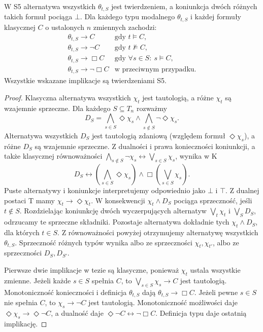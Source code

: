 \begin{lemat}
\label{lem:ncl-modal-S5-partition}
W S5 alternatywa wszystkich $\theta_{t,S}$
jest twierdzeniem, a koniunkcja dwóch różnych
takich formuł pociąga $\bot$.
Dla każdego typu modalnego $\theta_{t,S}$
i każdej formuły klasycznej $C$ o ustalonych
$n$ zmiennych zachodzi:
\[
\begin{array}{ll}
 \theta_{t,S}\to C &\text{gdy }t\models C,\\
 \theta_{t,S}\to\neg C &\text{gdy }t\not\models C,\\
 \theta_{t,S}\to\Box C &\text{gdy }\forall s\in S:\ s\models C,\\
 \theta_{t,S}\to\neg\Box C &\text{w przeciwnym przypadku}.
\end{array}
\]
Wszystkie wskazane implikacje są twierdzeniami S5.
\end{lemat}
\begin{proof}
Klasyczna alternatywa wszystkich $\chi_t$
jest tautologią, a różne $\chi_t$ są wzajemnie
sprzeczne. Dla każdego $S\subseteq T_n$ rozważmy
\[
 D_S=\bigwedge_{s\in S}\Diamond\chi_s
      \wedge\bigwedge_{s\notin S}\neg\Diamond\chi_s.
\]
Alternatywa wszystkich $D_S$ jest tautologią
zdaniową (względem formuł $\Diamond\chi_s$),
a różne $D_S$ są wzajemnie sprzeczne.
Z dualności i prawa konieczności koniunkcji,
a także klasycznej równoważności
$\bigwedge_{s\notin S}\neg\chi_s
\leftrightarrow\bigvee_{s\in S}\chi_s$,
wynika w K
\[
 D_S\leftrightarrow
 \left(\bigwedge_{s\in S}\Diamond\chi_s\right)
 \wedge\Box\left(\bigvee_{s\in S}\chi_s\right).
\]
Puste alternatywy i koniunkcje interpretujemy
odpowiednio jako $\bot$ i $\top$.
Z dualnej postaci T mamy
$\chi_t\to\Diamond\chi_t$.
W konsekwencji $\chi_t\wedge D_S$ pociąga
sprzeczność, jeśli $t\notin S$.
Rozdzielając koniunkcję dwóch wyczerpujących
alternatyw $\bigvee_t\chi_t$ i $\bigvee_S D_S$,
odrzucamy te sprzeczne składniki.
Pozostaje alternatywa dokładnie tych
$\chi_t\wedge D_S$, dla których $t\in S$.
Z równoważności powyżej otrzymujemy
alternatywę wszystkich $\theta_{t,S}$.
Sprzeczność różnych typów wynika albo
ze sprzeczności $\chi_t,\chi_{t'}$,
albo ze sprzeczności $D_S,D_{S'}$.

Pierwsze dwie implikacje w tezie są klasyczne,
ponieważ $\chi_t$ ustala wszystkie zmienne.
Jeżeli każde $s\in S$ spełnia $C$, to
$\bigvee_{s\in S}\chi_s\to C$ jest tautologią.
Monotoniczność konieczności i definicja
$\theta_{t,S}$ dają $\theta_{t,S}\to\Box C$.
Jeżeli pewne $s\in S$ nie spełnia $C$, to
$\chi_s\to\neg C$ jest tautologią.
Monotoniczność możliwości daje
$\Diamond\chi_s\to\Diamond\neg C$,
a dualność daje $\Diamond\neg C\leftrightarrow\neg\Box C$.
Definicja typu daje ostatnią implikację.
\end{proof}

